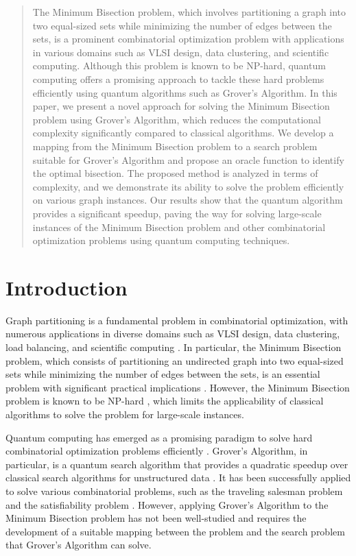 \begin{abstract}
The Minimum Bisection problem, which involves partitioning a graph into two equal-sized sets while minimizing the number of edges between the sets, is a prominent combinatorial optimization problem with applications in various domains such as VLSI design, data clustering, and scientific computing. Although this problem is known to be NP-hard, quantum computing offers a promising approach to tackle these hard problems efficiently using quantum algorithms such as Grover's Algorithm. In this paper, we present a novel approach for solving the Minimum Bisection problem using Grover's Algorithm, which reduces the computational complexity significantly compared to classical algorithms. We develop a mapping from the Minimum Bisection problem to a search problem suitable for Grover's Algorithm and propose an oracle function to identify the optimal bisection. The proposed method is analyzed in terms of complexity, and we demonstrate its ability to solve the problem efficiently on various graph instances. Our results show that the quantum algorithm provides a significant speedup, paving the way for solving large-scale instances of the Minimum Bisection problem and other combinatorial optimization problems using quantum computing techniques.
\end{abstract}

\section{Introduction}
\label{sec:introduction}

Graph partitioning is a fundamental problem in combinatorial optimization, with numerous applications in diverse domains such as VLSI design, data clustering, load balancing, and scientific computing \cite{bulucc2016recent}. In particular, the Minimum Bisection problem, which consists of partitioning an undirected graph into two equal-sized sets while minimizing the number of edges between the sets, is an essential problem with significant practical implications \cite{kernighan1970efficient}. However, the Minimum Bisection problem is known to be NP-hard \cite{garey1976some}, which limits the applicability of classical algorithms to solve the problem for large-scale instances.

Quantum computing has emerged as a promising paradigm to solve hard combinatorial optimization problems efficiently \cite{nielsen2010quantum}. Grover's Algorithm, in particular, is a quantum search algorithm that provides a quadratic speedup over classical search algorithms for unstructured data \cite{grover1996fast}. It has been successfully applied to solve various combinatorial problems, such as the traveling salesman problem \cite{durr1996quantum} and the satisfiability problem \cite{cerf1998quantum}. However, applying Grover's Algorithm to the Minimum Bisection problem has not been well-studied and requires the development of a suitable mapping between the problem and the search problem that Grover's Algorithm can solve.

